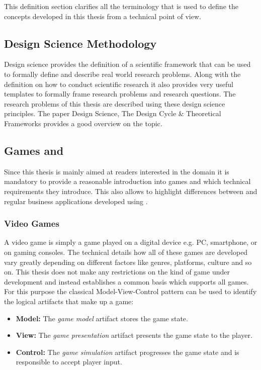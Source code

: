 This definition section clarifies all the terminology that is used to define the
concepts developed in this thesis from a technical point of view.

\subsection{Design Science Methodology}

Design science provides the definition of a scientific framework that can be
used to formally define and describe real world research problems. Along with the
definition on how to conduct scientific research it also provides very useful
templates to formally frame research problems and research questions. The
research problems of this thesis are described using these design science
principles. The paper Design Science, The Design Cycle \& Theoretical Frameworks
\cite{biedermann2016design_science} provides a good overview on the topic.

\subsection{Games and \ogs{}}
\label{sub:games}

Since this thesis is mainly aimed at readers interested in the \ms{} domain it
is mandatory to provide a reasonable introduction into games and which technical
requirements they introduce. This also allows to highlight differences between
\ogs{} and regular business applications developed using \mss{}.

\subsubsection{Video Games}

A video game is simply a game played on a digital device e.g. PC, smartphone, or
on gaming consoles. The technical details how all of these games are developed
vary greatly depending on different factors like genres, platforms, culture
and so on. This thesis does not make any restrictions on the kind of game
under development and instead establishes a common basis which supports all
games. For this purpose the classical Model-View-Control pattern can be used to
identify the logical artifacts that make up a game: 

\begin{itemize}
  \item \textbf{Model:} The \textit{game model} artifact stores the game state.
  \item \textbf{View:} The \textit{game presentation} artifact presents the game
  state to the player.
  \item \textbf{Control:} The \textit{game simulation} artifact progresses the
  game state and is responsible to accept player input.
\end{itemize}


